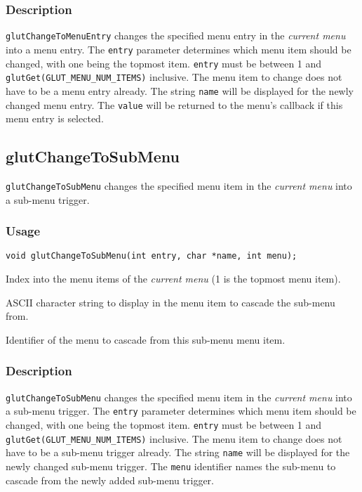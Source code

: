 \subsubsection*{Description}

{\tt glutChangeToMenuEntry} changes the specified menu entry in the {\em current
menu} into a menu entry.  The {\tt entry} parameter determines which menu
item should be changed, with one being the topmost item.  
{\tt entry} must be between 1 and {\tt glutGet(GLUT\_MENU\_NUM\_ITEMS)}
inclusive.
The menu item to
change does not have to be a menu entry already.  The string {\tt name}
will be displayed for the newly changed menu entry.  The {\tt value}
will be returned to the menu's callback if this menu entry is selected.

\subsection{glutChangeToSubMenu}

{\tt glutChangeToSubMenu} changes the specified menu item in the {\em
current menu} into a sub-menu trigger.

\subsubsection*{Usage}
\begin{verbatim}
void glutChangeToSubMenu(int entry, char *name, int menu);
\end{verbatim}
\begin{description}
\itemsep 0in
\item[\tt entry]
Index into the menu items of the {\em current menu} (1 is the topmost
menu item).
\item[\tt name]
ASCII character string to display in the menu item to cascade the sub-menu from.
\item[\tt menu]
Identifier of the menu to cascade from this sub-menu menu item.
\end{description}

\subsubsection*{Description}

{\tt glutChangeToSubMenu} changes the specified menu item in the {\em
current menu} into a sub-menu trigger.  The {\tt entry} parameter
determines which menu item should be changed, with one being the
topmost item.  
{\tt entry} must be between 1 and {\tt glutGet(GLUT\_MENU\_NUM\_ITEMS)}
inclusive.
The menu item to change does not have to be a sub-menu
trigger already.  The string {\tt name}
will be displayed for the newly changed sub-menu trigger.
The {\tt menu} identifier names the sub-menu to cascade from the
newly added sub-menu trigger.

